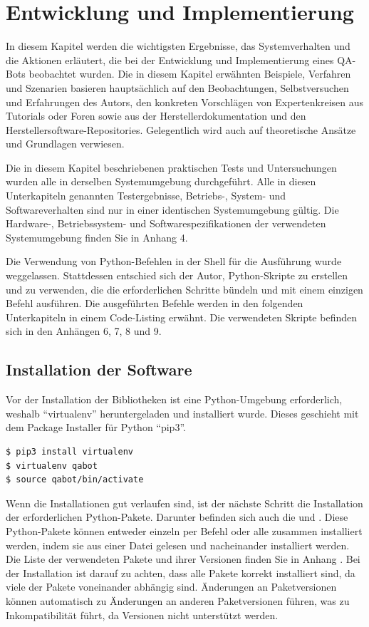 \documentclass[
        ngerman,
        paper=a4,
        numbers=noendperiod,
]{scrreprt}
\begin{document}
\chapter{Entwicklung und Implementierung}
In diesem Kapitel werden die wichtigsten Ergebnisse, das Systemverhalten und die Aktionen erläutert, die bei der Entwicklung und Implementierung eines QA-Bots beobachtet wurden. Die in diesem Kapitel erwähnten Beispiele, Verfahren und Szenarien basieren hauptsächlich auf den Beobachtungen, Selbstversuchen und Erfahrungen des Autors, den konkreten Vorschlägen von Expertenkreisen aus Tutorials oder Foren sowie aus der Herstellerdokumentation und den Herstellersoftware-Repositories. Gelegentlich wird auch auf theoretische Ansätze und Grundlagen verwiesen.

Die in diesem Kapitel beschriebenen praktischen Tests und Untersuchungen wurden alle in derselben Systemumgebung durchgeführt. Alle in diesen Unterkapiteln genannten Testergebnisse, Betriebs-, System- und Softwareverhalten sind nur in einer identischen Systemumgebung gültig. Die Hardware-, Betriebssystem- und Softwarespezifikationen der verwendeten Systemumgebung finden Sie in Anhang 4. %

Die Verwendung von Python-Befehlen in der Shell für die Ausführung wurde weggelassen. Stattdessen entschied sich der Autor, Python-Skripte zu erstellen und zu verwenden, die die erforderlichen Schritte bündeln und mit einem einzigen Befehl ausführen. Die ausgeführten Befehle werden in den folgenden Unterkapiteln in einem Code-Listing erwähnt. Die verwendeten Skripte befinden sich in den Anhängen 6, 7, 8 und 9. %

\section{Installation der Software}
Vor der Installation der Bibliotheken ist eine Python-Umgebung erforderlich, weshalb \enquote{virtualenv} heruntergeladen und installiert wurde. Dieses geschieht mit dem Package Installer für Python \enquote{pip3}.

\begin{lstlisting}[language=bash, caption=Einrichten der virtuellen Umgebung]
$ pip3 install virtualenv
$ virtualenv qabot
$ source qabot/bin/activate
\end{lstlisting}

Wenn die Installationen gut verlaufen sind, ist der nächste Schritt die Installation der erforderlichen Python-Pakete.
Darunter befinden sich auch die  und . Diese Python-Pakete können entweder einzeln per Befehl oder alle zusammen installiert werden, indem sie aus einer Datei gelesen und nacheinander installiert werden. Die Liste der verwendeten Pakete und ihrer Versionen finden Sie in Anhang . Bei der Installation ist darauf zu achten, dass alle Pakete korrekt installiert sind, da viele der Pakete voneinander abhängig sind. Änderungen an Paketversionen können automatisch zu Änderungen an anderen Paketversionen führen, was zu Inkompatibilität führt, da Versionen nicht unterstützt werden. 
\end{document}
